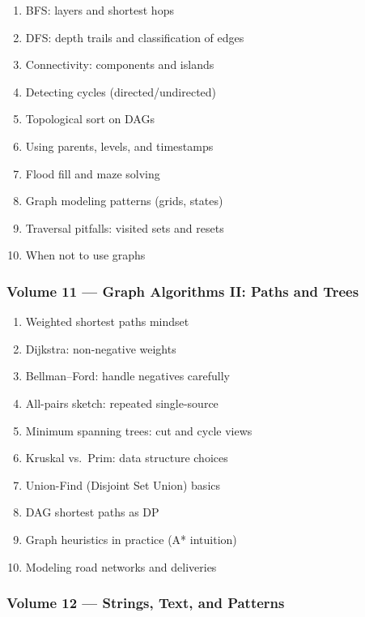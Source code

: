 \documentclass[
  letterpaper,
  DIV=11,
  numbers=noendperiod]{scrreprt}
\providecommand{\tightlist}{%
  \setlength{\itemsep}{0pt}\setlength{\parskip}{0pt}}
\begin{document}
\begin{enumerate}
\def\labelenumi{\arabic{enumi}.}
\setcounter{enumi}{90}
\tightlist
\item
  BFS: layers and shortest hops
\item
  DFS: depth trails and classification of edges
\item
  Connectivity: components and islands
\item
  Detecting cycles (directed/undirected)
\item
  Topological sort on DAGs
\item
  Using parents, levels, and timestamps
\item
  Flood fill and maze solving
\item
  Graph modeling patterns (grids, states)
\item
  Traversal pitfalls: visited sets and resets
\item
  When not to use graphs
\end{enumerate}

\subsubsection{Volume 11 --- Graph Algorithms II: Paths and
Trees}\label{volume-11-graph-algorithms-ii-paths-and-trees}

\begin{enumerate}
\def\labelenumi{\arabic{enumi}.}
\setcounter{enumi}{100}
\tightlist
\item
  Weighted shortest paths mindset
\item
  Dijkstra: non-negative weights
\item
  Bellman--Ford: handle negatives carefully
\item
  All-pairs sketch: repeated single-source
\item
  Minimum spanning trees: cut and cycle views
\item
  Kruskal vs.~Prim: data structure choices
\item
  Union-Find (Disjoint Set Union) basics
\item
  DAG shortest paths as DP
\item
  Graph heuristics in practice (A* intuition)
\item
  Modeling road networks and deliveries
\end{enumerate}

\subsubsection{Volume 12 --- Strings, Text, and
Patterns}\label{volume-12-strings-text-and-patterns}
\end{document}
